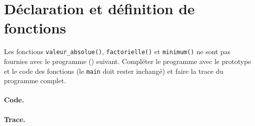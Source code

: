 \section{Déclaration et définition de fonctions}

Les fonctions \verb+valeur_absolue()+, \verb+factorielle()+ et
\verb+minimum()+ ne sont pas fournies avec le programme ()
suivant. Compléter le programme avec le prototype et le code des
fonctions (le \verb+main+ doit rester inchangé) et
faire la trace du programme complet.

{\footnotesize
{}
}

\begin{correction}

\paragraph{Code.}

{\footnotesize
{}
}


  \paragraph{Trace.}


\end{correction}
